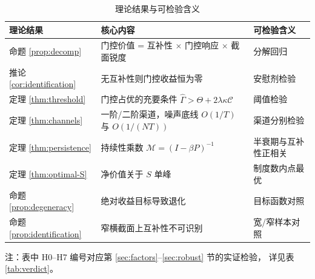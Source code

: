 \begin{table}[htbp]
\centering
\caption{理论结果与可检验含义}
\label{tab:theory-map}
\begin{threeparttable}
\small
\begin{tabular}{p{3.0cm}p{6.6cm}p{4.4cm}}
\toprule
理论结果 & 核心内容 & 可检验含义 \\
\midrule
命题 \ref{prop:decomp} & 门控价值 = 互补性 $\times$ 门控响应 $\times$ 截面锐度 & 分解回归 \\
推论 \ref{cor:identification} & 无互补性则门控收益恒为零 & 安慰剂检验 \\
定理 \ref{thm:threshold} & 门控占优的充要条件 $\hat\Gamma>\Theta+2\lambda\kappa\mathcal{C}$ & 阈值检验 \\
定理 \ref{thm:channels} & 一阶/二阶渠道，噪声底线 $O(1/T)$ 与 $O(1/(NT))$ & 渠道分别检验 \\
定理 \ref{thm:persistence} & 持续性乘数 $\mathcal{M}=(I-\beta P)^{-1}$ & 半衰期与互补性正相关 \\
定理 \ref{thm:optimal-S} & 净价值关于 $S$ 单峰 & 制度数内点最优 \\
命题 \ref{prop:degeneracy} & 绝对收益目标导致退化 & 目标函数对照 \\
命题 \ref{prop:identification} & 窄横截面上互补性不可识别 & 宽/窄样本对照 \\
\bottomrule
\end{tabular}
\begin{tablenotes}[flushleft]\footnotesize
\item 注：表中 H0--H7 编号对应第 \ref{sec:factors}--\ref{sec:robust} 节的实证检验，
详见表 \ref{tab:verdict}。
\end{tablenotes}
\end{threeparttable}
\end{table}
